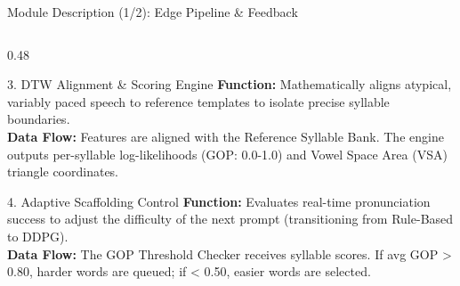 \documentclass[aspectratio=169, 11pt, xcolor=table]{beamer}
\begin{document}
\begin{frame}{Module Description (1/2): Edge Pipeline \& Feedback}
\begin{columns}[T, totalwidth=\textwidth]
        \begin{column}{0.48\textwidth}
            \begin{block}{3. DTW Alignment \& Scoring Engine}
                \tiny
                \textbf{Function:} Mathematically aligns atypical, variably paced speech to reference templates to isolate precise syllable boundaries.\\
                \textbf{Data Flow:} Features are aligned with the Reference Syllable Bank. The engine outputs per-syllable log-likelihoods (GOP: 0.0-1.0) and Vowel Space Area (VSA) triangle coordinates.
            \end{block}

            \vspace{1mm}
            \begin{block}{4. Adaptive Scaffolding Control}
                \tiny
                \textbf{Function:} Evaluates real-time pronunciation success to adjust the difficulty of the next prompt (transitioning from Rule-Based to DDPG). \\
                \textbf{Data Flow:} The GOP Threshold Checker receives syllable scores. If avg GOP > 0.80, harder words are queued; if < 0.50, easier words are selected.
            \end{block}
        \end{column}

    \end{columns}
\end{frame}
\end{document}
